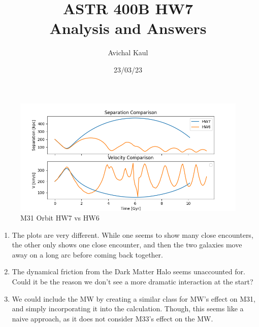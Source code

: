 \documentclass{article}
\title{ASTR 400B HW7 \\ Analysis and Answers}
\author{Avichal Kaul}
\date{23/03/23}
\begin{document}
	\maketitle

\begin{figure}[htpb]
	\centering
	\includegraphics[width=1\textwidth]{../fig.png}
	\caption{M31 Orbit HW7 vs HW6}
	\label{fig:}
\end{figure}	
\begin{enumerate}
	\item The plots are very different. While one seems to show many close encounters, the other only shows one close encounter, and then the two galaxies move away on a long arc before coming back together.
	\item The dynamical friction from the Dark Matter Halo seems unaccounted for. Could it be the reason we don't see a more dramatic interaction at the start?
	\item We could include the MW by creating a similar class for MW's effect on M31, and simply incorporating it into the calculation. Though, this seems like a naive approach, as it does not consider M33's effect on the MW. 
\end{enumerate}
\end{document}
